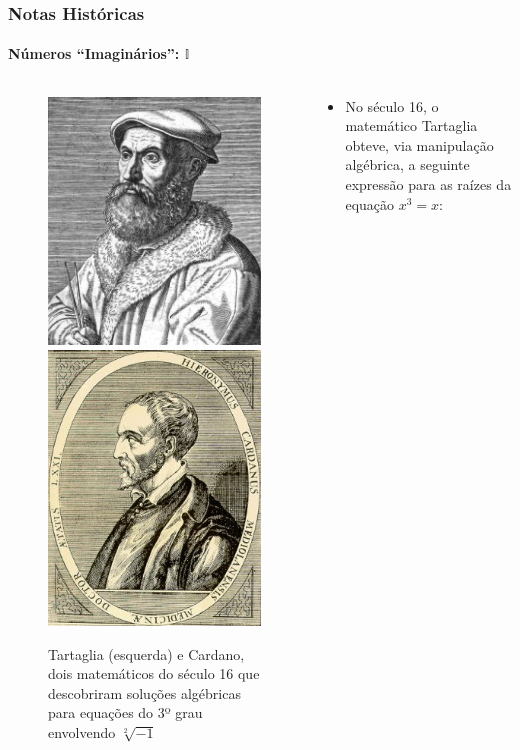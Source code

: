 \documentclass[usenames,dvipsnames,svgnames]{beamer}
\begin{document}
\begin{frame}	
	\frametitle{Notas Históricas}
	\framesubtitle{Números ``Imaginários'': $\mathbb{I}$}

	\begin{columns}[t]
	\begin{column}{.3\textwidth}
		\begin{figure}
			\includegraphics[width=0.555\linewidth]{pictures/Tartaglia}
			\includegraphics[width=0.5\linewidth]{pictures/Cardan}
			\caption{\small Tartaglia (esquerda) e Cardano, dois matemáticos do século 16 que descobriram soluções algébricas para equações do 3º grau envolvendo $\sqrt[2]{-1}$}
		\end{figure}
	\end{column}
	\begin{column}{.7\textwidth}
		\small
		\begin{itemize}
		\item No século 16, o matemático Tartaglia obteve, via manipulação algébrica, a seguinte expressão para as raízes da equação $x^3 = x$:

\end{itemize}
\end{column}
\end{columns}
\end{frame}
\end{document}
